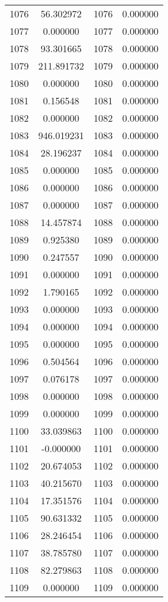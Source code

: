 \documentclass[12pt]{article}
\begin{document}
\begin{longtable}{@{}cccc@{}}
1076 & 56.302972 & 1076 & 0.000000 \\
1077 & 0.000000 & 1077 & 0.000000 \\
1078 & 93.301665 & 1078 & 0.000000 \\
1079 & 211.891732 & 1079 & 0.000000 \\
1080 & 0.000000 & 1080 & 0.000000 \\
1081 & 0.156548 & 1081 & 0.000000 \\
1082 & 0.000000 & 1082 & 0.000000 \\
1083 & 946.019231 & 1083 & 0.000000 \\
1084 & 28.196237 & 1084 & 0.000000 \\
1085 & 0.000000 & 1085 & 0.000000 \\
1086 & 0.000000 & 1086 & 0.000000 \\
1087 & 0.000000 & 1087 & 0.000000 \\
1088 & 14.457874 & 1088 & 0.000000 \\
1089 & 0.925380 & 1089 & 0.000000 \\
1090 & 0.247557 & 1090 & 0.000000 \\
1091 & 0.000000 & 1091 & 0.000000 \\
1092 & 1.790165 & 1092 & 0.000000 \\
1093 & 0.000000 & 1093 & 0.000000 \\
1094 & 0.000000 & 1094 & 0.000000 \\
1095 & 0.000000 & 1095 & 0.000000 \\
1096 & 0.504564 & 1096 & 0.000000 \\
1097 & 0.076178 & 1097 & 0.000000 \\
1098 & 0.000000 & 1098 & 0.000000 \\
1099 & 0.000000 & 1099 & 0.000000 \\
1100 & 33.039863 & 1100 & 0.000000 \\
1101 & -0.000000 & 1101 & 0.000000 \\
1102 & 20.674053 & 1102 & 0.000000 \\
1103 & 40.215670 & 1103 & 0.000000 \\
1104 & 17.351576 & 1104 & 0.000000 \\
1105 & 90.631332 & 1105 & 0.000000 \\
1106 & 28.246454 & 1106 & 0.000000 \\
1107 & 38.785780 & 1107 & 0.000000 \\
1108 & 82.279863 & 1108 & 0.000000 \\
1109 & 0.000000 & 1109 & 0.000000 \\

\end{longtable}
\end{document}
